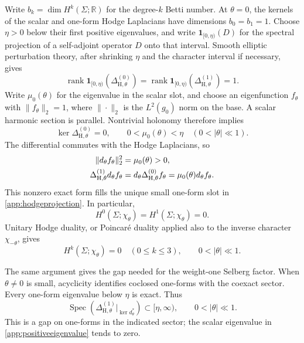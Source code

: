 \documentclass[11pt,letterpaper,reqno]{amsart}
\theoremstyle{remark}
\begin{document}
Write $b_k=\dim H^k(\Sigma;\mathbb R)$ for the degree-$k$ Betti number.
At $\theta=0$, the kernels of the scalar and one-form Hodge
Laplacians have dimensions $b_0=b_1=1$. Choose $\eta>0$ below their
first positive eigenvalues, and write $\mathbf1_{[0,\eta)}(D)$ for the
spectral projection of a self-adjoint operator $D$ onto that interval.
Smooth elliptic perturbation theory, after
shrinking $\eta$ and the character interval if necessary, gives
\begin{equation}\label{app:hodgeprojection}
 \operatorname{rank}\mathbf1_{[0,\eta)}
       (\Delta_{\mathrm H,\theta}^{(0)})
 =\operatorname{rank}\mathbf1_{[0,\eta)}
       (\Delta_{\mathrm H,\theta}^{(1)})=1.
\end{equation}
Write $\mu_0(\theta)$ for the eigenvalue in the scalar slot, and
choose an eigenfunction $f_\theta$ with $\|f_\theta\|_2=1$, where
$\|\cdot\|_2$ is the $L^2(g_0)$ norm on the base.
A scalar harmonic section is parallel. Nontrivial holonomy therefore
implies
\begin{equation}\label{app:positiveeigenvalue}
 \ker\Delta_{\mathrm H,\theta}^{(0)}=0,
 \qquad 0<\mu_0(\theta)<\eta
 \quad(0<|\theta|\ll1).
\end{equation}
The differential commutes with the Hodge Laplacians, so
\begin{align}\label{app:exactslot}
 \|d_\theta f_\theta\|_2^2&=\mu_0(\theta)>0,\notag\\
 \Delta_{\mathrm H,\theta}^{(1)}d_\theta f_\theta
 &=d_\theta\Delta_{\mathrm H,\theta}^{(0)}f_\theta
  =\mu_0(\theta)d_\theta f_\theta.
\end{align}
This nonzero exact form fills the unique small one-form slot in
\eqref{app:hodgeprojection}. In particular,
\begin{equation}\label{app:h01}
 H^0(\Sigma;\chi_\theta)=H^1(\Sigma;\chi_\theta)=0.
\end{equation}
Unitary Hodge duality, or Poincar\'e duality applied also to the
inverse character $\chi_{-\theta}$, gives
\begin{equation}\label{app:acyclic}
 H^k(\Sigma;\chi_\theta)=0\quad(0\leq k\leq3),
 \qquad 0<|\theta|\ll1.
\end{equation}

The same argument gives the gap needed for the weight-one Selberg
factor. When $\theta\ne0$ is small, acyclicity identifies coclosed
one-forms with the coexact sector. Every one-form eigenvalue below
$\eta$ is exact. Thus
\begin{equation}\label{app:coexactgap}
 \operatorname{Spec}\!\left(
 \Delta_{\mathrm H,\theta}^{(1)}\big|_{\ker d_\theta^*}\right)
 \subset[\eta,\infty),\qquad 0<|\theta|\ll1.
\end{equation}
This is a gap on one-forms in the indicated sector; the scalar
eigenvalue in \eqref{app:positiveeigenvalue} tends to zero.
\end{document}
